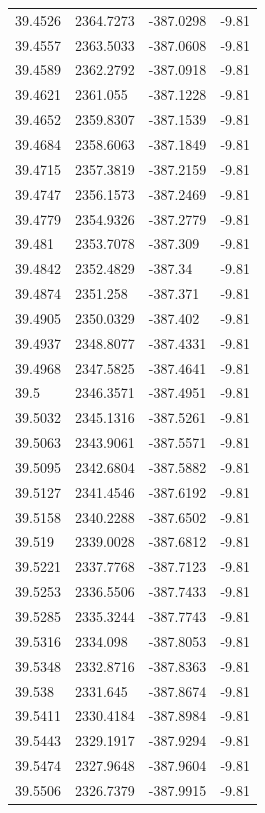\begin{table}[H]
\begin{tabular}{llll}
39.4526 & 2364.7273 & -387.0298 & -9.81 \\
39.4557 & 2363.5033 & -387.0608 & -9.81 \\
39.4589 & 2362.2792 & -387.0918 & -9.81 \\
39.4621 & 2361.055 & -387.1228 & -9.81 \\
39.4652 & 2359.8307 & -387.1539 & -9.81 \\
39.4684 & 2358.6063 & -387.1849 & -9.81 \\
39.4715 & 2357.3819 & -387.2159 & -9.81 \\
39.4747 & 2356.1573 & -387.2469 & -9.81 \\
39.4779 & 2354.9326 & -387.2779 & -9.81 \\
39.481 & 2353.7078 & -387.309 & -9.81 \\
39.4842 & 2352.4829 & -387.34 & -9.81 \\
39.4874 & 2351.258 & -387.371 & -9.81 \\
39.4905 & 2350.0329 & -387.402 & -9.81 \\
39.4937 & 2348.8077 & -387.4331 & -9.81 \\
39.4968 & 2347.5825 & -387.4641 & -9.81 \\
39.5 & 2346.3571 & -387.4951 & -9.81 \\
39.5032 & 2345.1316 & -387.5261 & -9.81 \\
39.5063 & 2343.9061 & -387.5571 & -9.81 \\
39.5095 & 2342.6804 & -387.5882 & -9.81 \\
39.5127 & 2341.4546 & -387.6192 & -9.81 \\
39.5158 & 2340.2288 & -387.6502 & -9.81 \\
39.519 & 2339.0028 & -387.6812 & -9.81 \\
39.5221 & 2337.7768 & -387.7123 & -9.81 \\
39.5253 & 2336.5506 & -387.7433 & -9.81 \\
39.5285 & 2335.3244 & -387.7743 & -9.81 \\
39.5316 & 2334.098 & -387.8053 & -9.81 \\
39.5348 & 2332.8716 & -387.8363 & -9.81 \\
39.538 & 2331.645 & -387.8674 & -9.81 \\
39.5411 & 2330.4184 & -387.8984 & -9.81 \\
39.5443 & 2329.1917 & -387.9294 & -9.81 \\
39.5474 & 2327.9648 & -387.9604 & -9.81 \\
39.5506 & 2326.7379 & -387.9915 & -9.81 \\

\end{tabular}
\end{table}
